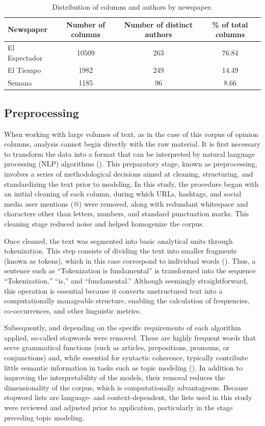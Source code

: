 \documentclass[11pt,a4paper]{article}
\begin{document}
	\begin{table}[H]
		\centering
		\caption{Distribution of columns and authors by newspaper.}
		\label{tab:col_autores_periodico}
		\footnotesize
		\begin{tabular}{l c c c}
			\hline
			\textbf{Newspaper} & \textbf{Number of columns} & \textbf{Number of distinct authors} & \textbf{\% of total columns} \\
			\hline
			El Espectador & 10509 & 263 & 76.84\\
			El Tiempo & 1982 &  249 & 14.49\\
			Semana & 1185 & 96  & 8.66\\
			\hline
		\end{tabular}
		
	\end{table}
	
	\subsection{Preprocessing}

		When working with large volumes of text, as in the case of this corpus of opinion columns, analysis cannot begin directly with the raw material. It is first necessary to transform the data into a format that can be interpreted by natural language processing (NLP) algorithms (\cite{Chai2022}). This preparatory stage, known as preprocessing, involves a series of methodological decisions aimed at cleaning, structuring, and standardizing the text prior to modeling. In this study, the procedure began with an initial cleaning of each column, during which URLs, hashtags, and social media user mentions (@) were removed, along with redundant whitespace and characters other than letters, numbers, and standard punctuation marks. This cleaning stage reduced noise and helped homogenize the corpus.

		Once cleaned, the text was segmented into basic analytical units through tokenization. This step consists of dividing the text into smaller fragments (known as tokens), which in this case correspond to individual words (\cite{Tyagi_text}). Thus, a sentence such as “Tokenization is fundamental” is transformed into the sequence “Tokenization,” “is,” and “fundamental.” Although seemingly straightforward, this operation is essential because it converts unstructured text into a computationally manageable structure, enabling the calculation of frequencies, co-occurrences, and other linguistic metrics.
		

		Subsequently, and depending on the specific requirements of each algorithm applied, so-called stopwords were removed. These are highly frequent words that serve grammatical functions (such as articles, prepositions, pronouns, or conjunctions) and, while essential for syntactic coherence, typically contribute little semantic information in tasks such as topic modeling (\cite{Siino2024}). In addition to improving the interpretability of the models, their removal reduces the dimensionality of the corpus, which is computationally advantageous. Because stopword lists are language- and context-dependent, the lists used in this study were reviewed and adjusted prior to application, particularly in the stage preceding topic modeling.
		
\end{document}
